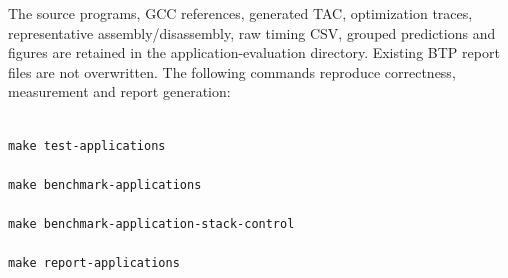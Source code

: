 The source programs, GCC references, generated TAC, optimization traces, representative assembly/disassembly, raw timing CSV, grouped predictions and figures are retained in the application-evaluation directory. Existing BTP report files are not overwritten. The following commands reproduce correctness, measurement and report generation:

\begin{lstlisting}[basicstyle=\ttfamily\small]

make test-applications

make benchmark-applications

make benchmark-application-stack-control

make report-applications

\end{lstlisting}

